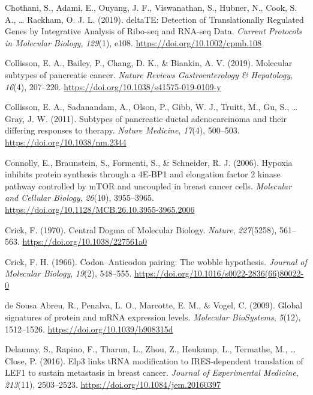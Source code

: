 \documentclass[12pt,openany]{book}
\begin{document}
\hypertarget{ref-Chothani2019}{}
Chothani, S., Adami, E., Ouyang, J. F., Viswanathan, S., Hubner, N.,
Cook, S. A., \ldots{} Rackham, O. J. L. (2019). deltaTE: Detection of
Translationally Regulated Genes by Integrative Analysis of Ribo-seq and
RNA-seq Data. \emph{Current Protocols in Molecular Biology},
\emph{129}(1), e108. \url{https://doi.org/10.1002/cpmb.108}

\hypertarget{ref-Collisson2019}{}
Collisson, E. A., Bailey, P., Chang, D. K., \& Biankin, A. V. (2019).
Molecular subtypes of pancreatic cancer. \emph{Nature Reviews
Gastroenterology \& Hepatology}, \emph{16}(4), 207--220.
\url{https://doi.org/10.1038/s41575-019-0109-y}

\hypertarget{ref-Collisson2011}{}
Collisson, E. A., Sadanandam, A., Olson, P., Gibb, W. J., Truitt, M.,
Gu, S., \ldots{} Gray, J. W. (2011). Subtypes of pancreatic ductal
adenocarcinoma and their differing responses to therapy. \emph{Nature
Medicine}, \emph{17}(4), 500--503. \url{https://doi.org/10.1038/nm.2344}

\hypertarget{ref-Connolly2006}{}
Connolly, E., Braunstein, S., Formenti, S., \& Schneider, R. J. (2006).
Hypoxia inhibits protein synthesis through a 4E-BP1 and elongation
factor 2 kinase pathway controlled by mTOR and uncoupled in breast
cancer cells. \emph{Molecular and Cellular Biology}, \emph{26}(10),
3955--3965. \url{https://doi.org/10.1128/MCB.26.10.3955-3965.2006}

\hypertarget{ref-Crick1970}{}
Crick, F. (1970). Central Dogma of Molecular Biology. \emph{Nature},
\emph{227}(5258), 561--563. \url{https://doi.org/10.1038/227561a0}

\hypertarget{ref-Crick1966}{}
Crick, F. H. (1966). Codon--Anticodon pairing: The wobble hypothesis.
\emph{Journal of Molecular Biology}, \emph{19}(2), 548--555.
\url{https://doi.org/10.1016/s0022-2836(66)80022-0}

\hypertarget{ref-deSousaAbreu2009}{}
de Sousa Abreu, R., Penalva, L. O., Marcotte, E. M., \& Vogel, C.
(2009). Global signatures of protein and mRNA expression levels.
\emph{Molecular BioSystems}, \emph{5}(12), 1512--1526.
\url{https://doi.org/10.1039/b908315d}

\hypertarget{ref-Delaunay2016}{}
Delaunay, S., Rapino, F., Tharun, L., Zhou, Z., Heukamp, L., Termathe,
M., \ldots{} Close, P. (2016). Elp3 links tRNA modification to
IRES-dependent translation of LEF1 to sustain metastasis in breast
cancer. \emph{Journal of Experimental Medicine}, \emph{213}(11),
2503--2523. \url{https://doi.org/10.1084/jem.20160397}
\end{document}

